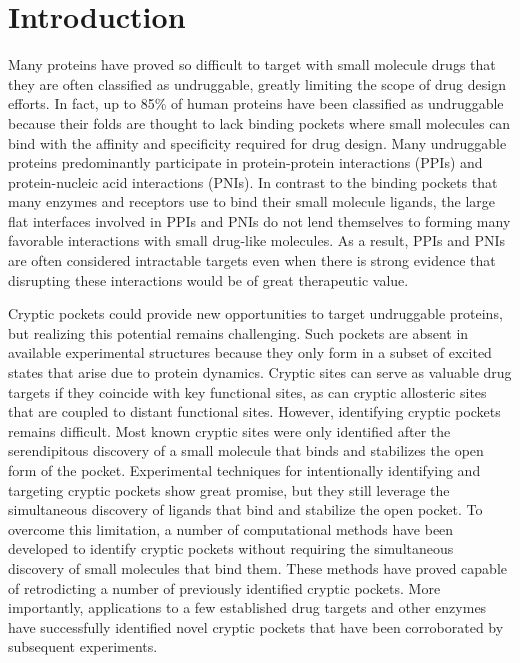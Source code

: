 \documentclass[../main.tex]{subfiles}
\begin{document}
\section{Introduction}
    Many proteins have proved so difficult to target with small molecule drugs that they are often classified as undruggable, greatly limiting the scope of drug design efforts. In fact, up to 85\% of human proteins have been classified as undruggable because their folds are thought to lack binding pockets where small molecules can bind with the affinity and specificity re{}quired for drug design\cite{hopkins_druggable_2002}. Many undruggable proteins predominantly participate in protein-protein interactions (PPIs) and protein-nucleic acid interactions (PNIs)\cite{arkin_small-molecule_2004,johnson_computational_2017}. In contrast to the binding pockets that many enzymes and receptors use to bind their small molecule ligands, the large flat interfaces involved in PPIs and PNIs do not lend themselves to forming many favorable interactions with small drug-like molecules. As a result, PPIs and PNIs are often considered intractable targets even when there is strong evidence that disrupting these interactions would be of great therapeutic value.

    Cryptic pockets could provide new opportunities to target undruggable proteins\cite{Knoverek:2018kk,vajda_cryptic_2018}, but realizing this potential remains challenging. Such pockets are absent in available experimental structures because they only form in a subset of excited states that arise due to protein dynamics. Cryptic sites can serve as valuable drug targets if they coincide with key functional sites, as can cryptic allosteric sites that are coupled to distant functional sites. However, identifying cryptic pockets remains difficult. Most known cryptic sites were only identified after the serendipitous discovery of a small molecule that binds and stabilizes the open form of the pocket\cite{vajda_cryptic_2018,hardy_searching_2004}. Experimental techniques for intentionally identifying and targeting cryptic pockets show great promise\cite{erlanson_site-directed_2000,ostrem_k-rasg12c_2013,keedy_expanded_2018}, but they still leverage the simultaneous discovery of ligands that bind and stabilize the open pocket. To overcome this limitation, a number of computational methods have been developed to identify cryptic pockets without requiring the simultaneous discovery of small molecules that bind them\cite{Bowman:2012jd,Porter:2019hv,johnson_druggable_2013,oleinikovas_understanding_2016,cimermancic_cryptosite:_2016,schmidt_cosolvent-enhanced_2019,cuchillo_collective_2015,ghanakota_moving_2016}. These methods have proved capable of retrodicting a number of previously identified cryptic pockets. More importantly, applications to a few established drug targets and other enzymes have successfully identified novel cryptic pockets that have been corroborated by subsequent experiments\cite{Porter:2019hv,wassman_computational_2013,schames_discovery_2004}. 
\end{document}
